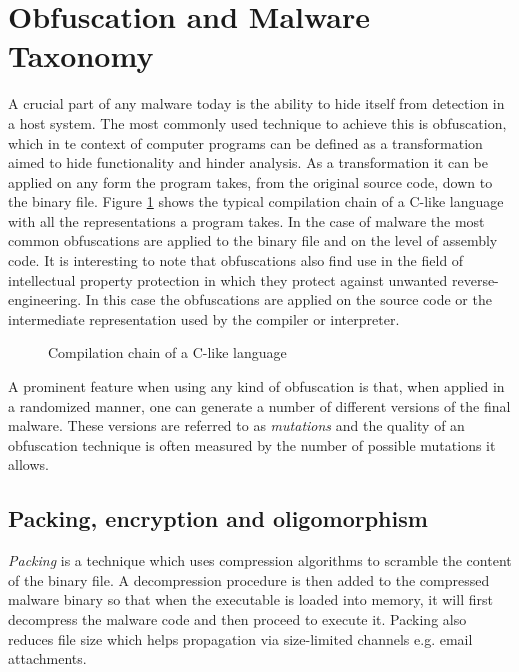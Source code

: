 \section{Obfuscation and Malware Taxonomy}
A crucial part of any malware today is the ability to hide itself from detection in a host system. The most commonly used technique to achieve this is obfuscation, which in te context of computer programs can be defined as a transformation aimed to hide functionality and hinder analysis. As a transformation it can be applied on any form the program takes, from the original source code, down to the binary file. Figure \ref{fig_comp} shows the typical compilation chain of a C-like language with all the representations a program takes. In the case of malware the most common obfuscations are applied to the binary file and on the level of assembly code. It is interesting to note that obfuscations also find use in the field of intellectual property protection in which they protect against unwanted reverse-engineering. In this case the obfuscations are applied on the source code or the intermediate representation used by the compiler or interpreter.

\begin{figure}[H]
    \centering
    \caption{Compilation chain of a C-like language}
    \label{fig_comp}
\end{figure}

A prominent feature when using any kind of obfuscation is that, when applied in a randomized manner, one can generate a number of different versions of the final malware. These versions are referred to as \emph{mutations} and the quality of an obfuscation technique is often measured by the number of possible mutations it allows.

\subsection{Packing, encryption and oligomorphism}
\emph{Packing} is a technique which uses compression algorithms to scramble the content of the binary file\cite{Symatec08}. A decompression procedure is then added to the compressed malware binary so that when the executable is loaded into memory, it will first decompress the malware code and then proceed to execute it. Packing also reduces file size which helps propagation via size-limited channels e.g. email attachments. 

